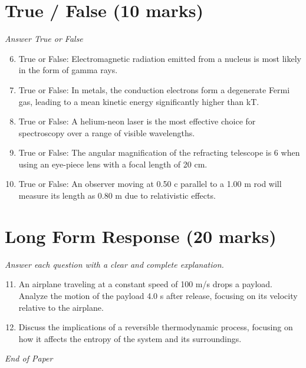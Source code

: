 \documentclass[12pt]{article}
\begin{document}
\section*{True / False (10 marks)}
\textit{Answer True or False}
\begin{enumerate}[label=\arabic*.]
\setcounter{enumi}{5}
\item True or False: Electromagnetic radiation emitted from a nucleus is most likely in the form of gamma rays.
\item True or False: In metals, the conduction electrons form a degenerate Fermi gas, leading to a mean kinetic energy significantly higher than kT.
\item True or False: A helium-neon laser is the most effective choice for spectroscopy over a range of visible wavelengths.
\item True or False: The angular magnification of the refracting telescope is 6 when using an eye-piece lens with a focal length of 20 cm.
\item True or False: An observer moving at 0.50 c parallel to a 1.00 m rod will measure its length as 0.80 m due to relativistic effects.
\end{enumerate}

\section*{Long Form Response (20 marks)}
\textit{Answer each question with a clear and complete explanation.}
\begin{enumerate}[label=\arabic*.]
\setcounter{enumi}{10}
\item An airplane traveling at a constant speed of 100 m/s drops a payload. Analyze the motion of the payload 4.0 s after release, focusing on its velocity relative to the airplane.
\item Discuss the implications of a reversible thermodynamic process, focusing on how it affects the entropy of the system and its surroundings.
\end{enumerate}

\vfill
\noindent\textit{End of Paper}
\end{document}
